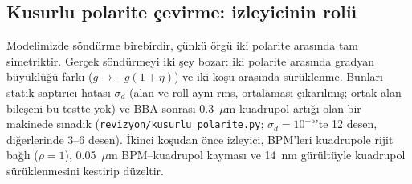 \documentclass[11pt,a4paper]{article}
\begin{document}
\subsection{Kusurlu polarite çevirme: izleyicinin rolü}
Modelimizde söndürme birebirdir, çünkü örgü iki polarite arasında tam simetriktir. Gerçek söndürmeyi iki şey
bozar: iki polarite arasında gradyan büyüklüğü farkı ($g\to-g(1+\eta)$) ve iki koşu arasında sürüklenme. Bunları
statik saptırıcı hatası $\sigma_d$ (alan ve roll aynı rms, ortalaması çıkarılmış; ortak alan bileşeni bu testte
yok) ve BBA sonrası 0.3~$\mu$m
kuadrupol artığı olan bir makinede sınadık (\texttt{revizyon/kusurlu\_polarite.py}; $\sigma_d=10^{-5}$'te 12
desen, diğerlerinde 3--6 desen). İkinci koşudan önce izleyici, BPM'leri kuadrupole rijit bağlı ($\rho=1$),
0.05~$\mu$m BPM--kuadrupol kayması ve 14~nm gürültüyle kuadrupol sürüklenmesini kestirip düzeltir.
\end{document}
